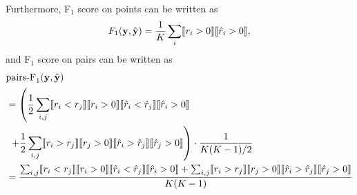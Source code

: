 Furthermore, F$_1$ score on points can be written as
\begin{equation*}
F_1(\mathbf{y}, \hat{\mathbf{y}}) = \frac{1}{K} \sum_i \llbracket r_i > 0 \rrbracket  \llbracket \hat{r}_i > 0 \rrbracket,
\end{equation*}
and F$_1$ score on pairs can be written as
\begin{align*}
& \text{pairs-F}_1(\mathbf{y}, \hat{\mathbf{y}}) \\
&= \left( \frac{1}{2} \sum_{i,j} \llbracket r_i < r_j \rrbracket  \llbracket r_i > 0 \rrbracket \llbracket \hat{r}_i < \hat{r}_j \rrbracket  \llbracket \hat{r}_i > 0 \rrbracket \right. \\
&  \left. ~+ \frac{1}{2} \sum_{i,j} \llbracket r_i > r_j \rrbracket  \llbracket r_j > 0 \rrbracket \llbracket \hat{r}_i > \hat{r}_j \rrbracket  \llbracket \hat{r}_j > 0 \rrbracket \right)
   \cdot \frac{1}{K(K-1)/2} \\
&= \frac{\sum_{i,j} \llbracket r_i < r_j \rrbracket  \llbracket r_i > 0 \rrbracket \llbracket \hat{r}_i < \hat{r}_j \rrbracket  \llbracket \hat{r}_i > 0 \rrbracket +
         \sum_{i,j} \llbracket r_i > r_j \rrbracket  \llbracket r_j > 0 \rrbracket \llbracket \hat{r}_i > \hat{r}_j \rrbracket  \llbracket \hat{r}_j > 0 \rrbracket} 
        {K(K-1)}
\end{align*}


